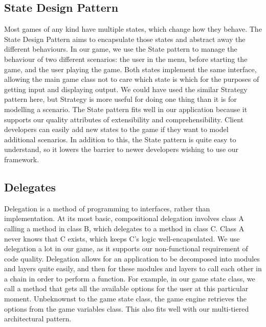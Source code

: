 \documentclass[11pt]{report}
\begin{document}
	\subsection{State Design Pattern}
	Most games of any kind have multiple states, which change how they behave. The State Design Pattern aims to encapsulate those states and abstract away the different behaviours. In our game, we use the State pattern to manage the behaviour of two different scenarios: the user in the menu, before starting the game, and the user playing the game. Both states implement the same interface, allowing the main game class not to care which state is which for the purposes of getting input and displaying output. We could have used the similar Strategy pattern here, but Strategy is more useful for doing one thing than it is for modelling a scenario. The State pattern fits well in our application because it supports our quality attributes of extensibility and comprehensibility. Client developers can easily add new states to the game if they want to model additional scenarios. In addition to this, the State pattern is quite easy to understand, so it lowers the barrier to newer developers wishing to use our framework.
	
	\subsection{Delegates}
	Delegation is a method of programming to interfaces, rather than implementation. At its most basic, compositional delegation involves class A calling a method in class B, which delegates to a method in class C. Class A never knows that C exists, which keeps C's logic well-encapsulated. We use delegation a lot in our game, as it supports our non-functional requirement of code quality. Delegation allows for an application to be decomposed into modules and layers quite easily, and then for these modules and layers to call each other in a chain in order to perform a function. For example, in our game state class, we call a method that gets all the available options for the user at this particular moment. Unbeknownst to the game state class, the game engine retrieves the options from the game variables class. This also fits well with our multi-tiered architectural pattern. 
\end{document}

